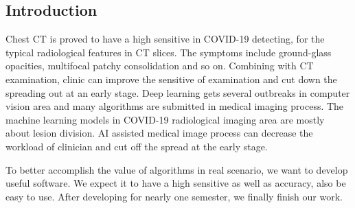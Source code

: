 \documentclass[
]{dtuposter}
\begin{document}
\begin{dtupostercontent}
\section{Introduction}
Chest CT is proved to have a high sensitive in COVID-19 detecting, for the typical radiological features in CT slices. The symptoms include ground-glass opacities, multifocal patchy consolidation and so on. Combining with CT examination, clinic can improve the sensitive of examination and cut down the spreading out at an early stage. Deep learning gets several outbreaks in computer vision area and many algorithms are submitted in medical imaging process. The machine learning models in COVID-19 radiological imaging area are mostly about lesion division. AI assisted medical image process can decrease the workload of clinician and cut off the spread at the early stage.  
\par{
To better accomplish the value of algorithms in real scenario, we want to develop useful software. We expect it to have a high sensitive as well as accuracy, also be easy to use. After developing for nearly one semester, we finally finish our work.
 }


\end{dtupostercontent}
\end{document}
